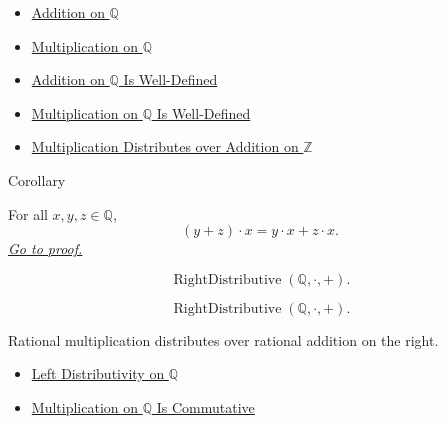 \begin{dependencies}
\begin{itemize}
  \item \hyperref[def:addition-on-q-classes]{Addition on $\mathbb{Q}$}
  \item \hyperref[def:multiplication-on-q-classes]{Multiplication on $\mathbb{Q}$}
  \item \hyperref[thm:addition-on-q-well-defined]{Addition on $\mathbb{Q}$ Is Well-Defined}
  \item \hyperref[thm:multiplication-on-q-well-defined]{Multiplication on $\mathbb{Q}$ Is Well-Defined}
  \item \hyperref[thm:multiplication-distributes-over-addition-on-z]{Multiplication Distributes over Addition on $\mathbb{Z}$}
\end{itemize}
\end{dependencies}

\begin{corollarybox}{Corollary}
\begin{corollary}
\label{cor:right-distributivity-on-q}
For all $x,y,z\in\mathbb{Q}$,
\[
(y+z)\cdot x=y\cdot x+z\cdot x.
\]
\hyperref[prf:right-distributivity-on-q]{\textit{Go to proof.}}
\end{corollary}
\end{corollarybox}

\begin{remark*}
\[
\operatorname{RightDistributive}(\mathbb{Q},\cdot,+).
\]
\end{remark*}

\begin{remark*}
\[
\operatorname{RightDistributive}(\mathbb{Q},\cdot,+).
\]
\end{remark*}

\begin{remark*}[Interpretation]
Rational multiplication distributes over rational addition on the right.
\end{remark*}

\begin{dependencies}
\begin{itemize}
  \item \hyperref[thm:left-distributivity-on-q]{Left Distributivity on $\mathbb{Q}$}
  \item \hyperref[thm:multiplication-on-q-commutative]{Multiplication on $\mathbb{Q}$ Is Commutative}
\end{itemize}
\end{dependencies}


